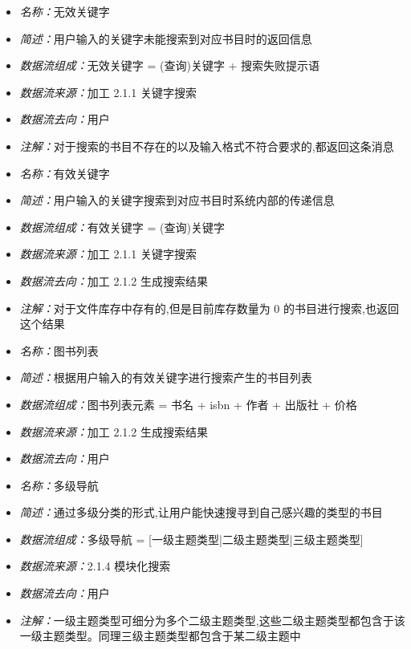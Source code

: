 \vspace{-1mm}

\begin{itemize}
	\item \textit{名称：}无效关键字
	\item \textit{简述：}用户输入的关键字未能搜索到对应书目时的返回信息
	\item \textit{数据流组成：}无效关键字 = (查询)关键字 + 搜索失败提示语
	\item \textit{数据流来源：}加工 2.1.1 关键字搜索
	\item \textit{数据流去向：}用户
	\item \textit{注解：}对于搜索的书目不存在的以及输入格式不符合要求的,都返回这条消息
\end{itemize}

\vspace{-1mm}

\begin{itemize}
	\item \textit{名称：}有效关键字
	\item \textit{简述：}用户输入的关键字搜索到对应书目时系统内部的传递信息
	\item \textit{数据流组成：}有效关键字 = (查询)关键字
	\item \textit{数据流来源：}加工 2.1.1 关键字搜索
	\item \textit{数据流去向：}加工 2.1.2 生成搜索结果
	\item \textit{注解：}对于文件库存中存有的,但是目前库存数量为 0 的书目进行搜索,也返回这个结果
\end{itemize}

\vspace{-1mm}

\begin{itemize}
	\item \textit{名称：}图书列表
	\item \textit{简述：}根据用户输入的有效关键字进行搜索产生的书目列表
	\item \textit{数据流组成：}图书列表元素 = 书名 + isbn + 作者 + 出版社 + 价格
	\item \textit{数据流来源：}加工 2.1.2 生成搜索结果
	\item \textit{数据流去向：}用户
\end{itemize}

\vspace{-1mm}

\begin{itemize}
	\item \textit{名称：}多级导航
	\item \textit{简述：}通过多级分类的形式,让用户能快速搜寻到自己感兴趣的类型的书目
	\item \textit{数据流组成：}多级导航 = [一级主题类型|二级主题类型|三级主题类型]
	\item \textit{数据流来源：}2.1.4 模块化搜索
	\item \textit{数据流去向：}用户
	\item \textit{注解：}一级主题类型可细分为多个二级主题类型,这些二级主题类型都包含于该一级主题类型。同理三级主题类型都包含于某二级主题中
\end{itemize}

